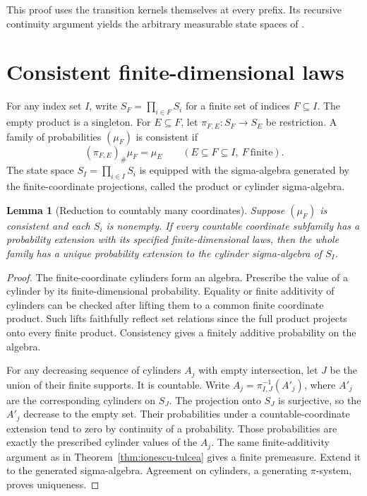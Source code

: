 \documentclass[11pt,oneside,openany]{book}
\theoremstyle{plain}
\newtheorem{lemma}[theorem]{Lemma}
\theoremstyle{definition}
\theoremstyle{remark}
\begin{document}
This proof uses the transition kernels themselves at every prefix. Its recursive continuity argument yields the arbitrary measurable state spaces of \cite[Theorem 8.24, pp.~180--181]{Kallenberg}.

\section{Consistent finite-dimensional laws}\label{p05-02}

For any index set \(I\), write \(S_F=\prod_{i\in F}S_i\) for a finite set of indices \(F\subseteq I\). The empty product is a singleton. For \(E\subseteq F\), let \(\pi_{F,E}:S_F\to S_E\) be restriction. A family of probabilities \((\mu_F)\) is consistent if
\[
 (\pi_{F,E})_\#\mu_F=\mu_E\qquad(E\subseteq F\subseteq I,\ F\ \text{finite}).
\]
The state space \(S_I=\prod_{i\in I}S_i\) is equipped with the sigma-algebra generated by the finite-coordinate projections, called the product or cylinder sigma-algebra.

\begin{lemma}[Reduction to countably many coordinates]\label{lem:countable-cylinder-reduction}
Suppose \((\mu_F)\) is consistent and each \(S_i\) is nonempty. If every countable coordinate subfamily has a probability extension with its specified finite-dimensional laws, then the whole family has a unique probability extension to the cylinder sigma-algebra of \(S_I\).
\end{lemma}
\begin{proof}
The finite-coordinate cylinders form an algebra. Prescribe the value of a cylinder by its finite-dimensional probability. Equality or finite additivity of cylinders can be checked after lifting them to a common finite coordinate product. Such lifts faithfully reflect set relations since the full product projects onto every finite product. Consistency gives a finitely additive probability on the algebra.

For any decreasing sequence of cylinders \(A_j\) with empty intersection, let \(J\) be the union of their finite supports. It is countable. Write \(A_j=\pi_{I,J}^{-1}(A'_j)\), where \(A'_j\) are the corresponding cylinders on \(S_J\). The projection onto \(S_J\) is surjective, so the \(A'_j\) decrease to the empty set. Their probabilities under a countable-coordinate extension tend to zero by continuity of a probability. Those probabilities are exactly the prescribed cylinder values of the \(A_j\). The same finite-additivity argument as in Theorem~\ref{thm:ionescu-tulcea} gives a finite premeasure. Extend it to the generated sigma-algebra. Agreement on cylinders, a generating \(\pi\)-system, proves uniqueness.
\end{proof}
\end{document}
